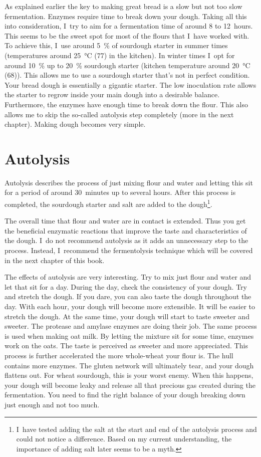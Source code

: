 As explained earlier the key to making great bread is a slow but not too slow
fermentation. Enzymes require time to break down your dough. Taking all this
into consideration, I~try to aim for a fermentation time of around 8 to 12~hours. This seems to be
the sweet spot for most of the flours that I~have worked with. To achieve this,
I~use around \qty{5}{\percent} of sourdough starter in summer times
(temperatures around \qty{25}{\degreeCelsius} (\qty{77}{\degF}) in the
kitchen). In winter times I~opt for around \qty{10}{\percent} up to
\qty{20}{\percent} sourdough starter (kitchen temperature around
\qty{20}{\degreeCelsius} (\qty{68}{\degF})). This
allows me to use a sourdough starter that's not in perfect condition. Your
bread dough is essentially a gigantic starter. The low inoculation rate allows
the starter to regrow inside your main dough into a desirable balance.
Furthermore, the enzymes have enough time to break down the flour. This also
allows me to skip the so-called autolysis step completely (more in the next chapter).
Making dough becomes very simple.

\section{Autolysis}%
\label{section:autolysis}

Autolysis describes the process of just mixing flour and water and letting
this sit for a period of around 30~minutes up to several hours. After this
process is completed, the sourdough starter and salt are added to the
dough\footnote{I~have tested adding the salt at the start and end of the
autolysis process and could not notice a difference. Based on my current
understanding, the importance of adding salt later seems to be a myth.}.

The overall time that flour and water are in contact is extended. Thus you get the
beneficial enzymatic reactions that improve the taste and characteristics of the
dough. I~do not recommend autolysis as it adds an unnecessary step to the
process. Instead, I~recommend the fermentolysis technique which will be covered in the
next chapter of this book.

The effects of autolysis are very interesting. Try to mix just flour and
water and let that sit for a day. During the day, check the consistency of
your dough. Try and stretch the dough. If you dare, you can also taste the
dough throughout the day. With each hour, your dough will become
more extensible. It will be easier to stretch the dough. At the same time, your
dough will start to taste sweeter and sweeter. The protease and amylase enzymes
are doing their job. The same process is used when making oat milk. By letting
the mixture sit for some time, enzymes work on the oats. The taste is perceived as
sweeter and more appreciated. This process is further accelerated the more
whole-wheat your flour is. The hull contains more enzymes. The gluten network
will ultimately tear, and your dough flattens out. For wheat sourdough, this is
your worst enemy. When this happens, your dough will become leaky and release
all that precious gas created during the fermentation. You need to find the
right balance of your dough breaking down just enough and not too much.

